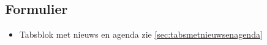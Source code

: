\subsection{Formulier}
\label{sec:formulier}

\begin{itemize}
  \item Tabsblok met nieuws en agenda zie \ref{sec:tabsmetnieuwsenagenda}
\end{itemize}